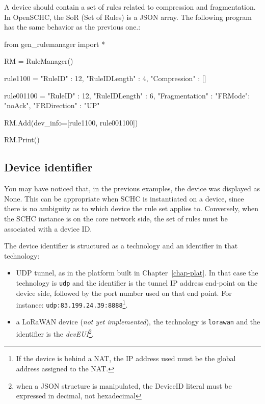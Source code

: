 A device should contain a set of rules related to compression and fragmentation. In OpenSCHC, the SoR (Set of Rules) is a JSON array. The following program has the same behavior as the previous one.:

\begin{termc}[backgroundcolor=\color{gray!10}, basicstyle=\ttfamily\small, escapechar=@, language=Python]
from gen_rulemanager import *

RM = RuleManager()

rule1100 =   {
 "RuleID" : 12,
 "RuleIDLength" : 4,
 "Compression" : []
}

rule001100 =   {
 "RuleID" : 12,
 "RuleIDLength" : 6,
 "Fragmentation" : {
   "FRMode": "noAck",
   "FRDirection" : "UP"
 }
}

RM.Add(dev_info=[rule1100, rule001100])

RM.Print()
\end{termc}

\subsection{Device identifier}

You may have noticed that, in the previous examples, the device was displayed as None. This can be appropriate when SCHC is instantiated on a device, since there is no ambiguity as to which device the rule set applies to. Conversely, when the SCHC instance is on the core network side, the set of rules must be associated with a device ID.

The device identifier is structured as a technology and an identifier in that technology:
\begin{itemize}
\item UDP tunnel, as in the platform built in Chapter~\vref{chap-plat}. In that case the technology is \texttt{udp} and the identifier is the tunnel IP address end-point on the device side, followed by the port number used on that end point. For instance: \texttt{udp:83.199.24.39:8888}\footnote{If the device is behind a NAT, the IP address used must be the global address assigned to the NAT.}. 
\item a LoRaWAN device (\textit{not yet implemented}), the technology is \texttt{lorawan} and the identifier is the \textit{devEUI}\footnote{when a JSON structure is manipulated, the DeviceID literal must be expressed in decimal, not hexadecimal}.

\end{itemize}

